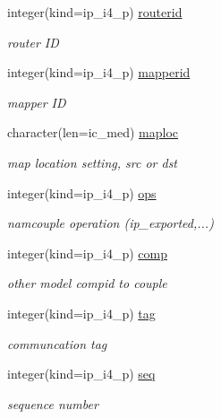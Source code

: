\begin{DoxyCompactItemize}
integer(kind=ip\+\_\+i4\+\_\+p) \hyperlink{structmod__oasis__coupler_1_1prism__coupler__type_ab6ce21d836e3fc511fcb028f99b0abd7}{routerid}
\begin{DoxyCompactList}\small\item\em router ID \end{DoxyCompactList}\item 
integer(kind=ip\+\_\+i4\+\_\+p) \hyperlink{structmod__oasis__coupler_1_1prism__coupler__type_ada880a13e931db47e72859515208ec1d}{mapperid}
\begin{DoxyCompactList}\small\item\em mapper ID \end{DoxyCompactList}\item 
character(len=ic\+\_\+med) \hyperlink{structmod__oasis__coupler_1_1prism__coupler__type_aab6763e489b8ace8cff0fbe9e62cbcd8}{maploc}
\begin{DoxyCompactList}\small\item\em map location setting, src or dst \end{DoxyCompactList}\item 
integer(kind=ip\+\_\+i4\+\_\+p) \hyperlink{structmod__oasis__coupler_1_1prism__coupler__type_ac041ba5de191fa34468f61a674dd5bac}{ops}
\begin{DoxyCompactList}\small\item\em namcouple operation (ip\+\_\+exported,...) \end{DoxyCompactList}\item 
integer(kind=ip\+\_\+i4\+\_\+p) \hyperlink{structmod__oasis__coupler_1_1prism__coupler__type_a77cc2858814776053af5f3958d29fee2}{comp}
\begin{DoxyCompactList}\small\item\em other model compid to couple \end{DoxyCompactList}\item 
integer(kind=ip\+\_\+i4\+\_\+p) \hyperlink{structmod__oasis__coupler_1_1prism__coupler__type_a3b8e0d2cd3f3001b4c82e7a911008a37}{tag}
\begin{DoxyCompactList}\small\item\em communcation tag \end{DoxyCompactList}\item 
integer(kind=ip\+\_\+i4\+\_\+p) \hyperlink{structmod__oasis__coupler_1_1prism__coupler__type_af1766ab1d9fe55670c551a9d0c7f2e00}{seq}
\begin{DoxyCompactList}\small\item\em sequence number \end{DoxyCompactList}\item 

\end{DoxyCompactItemize}
